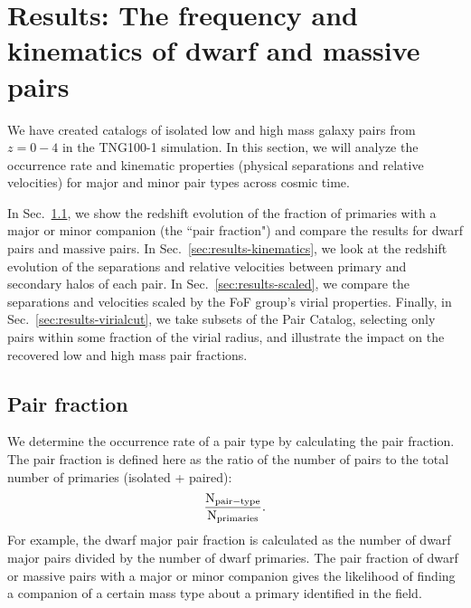 \documentclass[twocolumn]{aastex631}
\begin{document}

\section{Results: The frequency and kinematics of dwarf and massive pairs}
We have created catalogs of isolated low and high mass galaxy pairs from $z=0-4$ in the TNG100-1 simulation. 
In this section, we will analyze the occurrence rate and kinematic properties (physical separations and relative velocities) for major and minor pair types across cosmic time. 

In Sec.~\ref{sec:results-frac}, we show the redshift evolution of the fraction of primaries with a major or minor companion (the ``pair fraction") and compare the results for dwarf pairs and massive pairs.
In Sec.~\ref{sec:results-kinematics}, we look at the redshift evolution of the separations and relative velocities between primary and secondary halos of each pair. %
In Sec.~\ref{sec:results-scaled}, we compare the separations and velocities scaled by the FoF group's virial properties. 
Finally, in Sec.~\ref{sec:results-virialcut}, we take subsets of the Pair Catalog, selecting only pairs within some fraction of the virial radius, and illustrate the impact on the recovered low and high mass pair fractions. 

        


    \subsection{Pair fraction}\label{sec:results-frac}
    We determine the occurrence rate of a pair type by calculating the pair fraction. 
    The pair fraction is defined here as the ratio of the number of pairs to the total number of primaries (isolated + paired):
    $$\rm \frac{N_{pair-type}}{N_{primaries}}.$$
    For example, the dwarf major pair fraction is calculated as the number of dwarf major pairs divided by the number of dwarf primaries. 
    The pair fraction of dwarf or massive pairs with a major or minor companion gives the likelihood of finding a companion of a certain mass type about a primary identified in the field.
    
\end{document}
